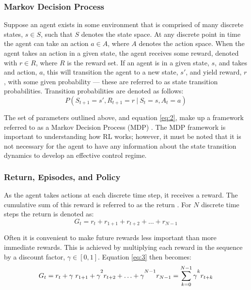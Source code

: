 \subsubsection{Markov Decision Process}\label{mdp1}
Suppose an agent exists in some environment that is comprised of many discrete states, $s \in S$, such that $S$ denotes the state space. At any discrete point in time the agent can take an action $a \in A$, where $A$ denotes the action space. When the agent takes an action in a given state, the agent receives some reward, denoted with $r \in R$, where $R$ is the reward set. If an agent is in a given state, $s$, and takes and action, $a$, this will transition the agent to a new state, $s'$, and yield reward, $r$, with some given probability --- these are referred to as state transition probabilities. Transition probabilities are denoted as follows:
\begin{equation}
P(S_{t+1}=s', R_{t+1}=r \ | \ S_t = s, A_t = a)\label{eq:2}
\end{equation}

The set of parameters outlined above, and equation \ref{eq:2}, make up a framework referred to as a Markov Decision Process (MDP) \cite{Bellm1957}. The MDP framework is important to understanding how RL works; however, it must be noted that it is not necessary for the agent to have any information about the state transition dynamics to develop an effective control regime.

\subsubsection{Return, Episodes, and Policy}\label{mdp2}
As the agent takes actions at each discrete time step, it receives a reward. The cumulative sum of this reward is referred to as the return \cite{openai2018}. For $N$ discrete time steps the return is denoted as:
\begin{equation}
G_t = r_t + r_{1+1} + r_{t+2} + \ldots + r_{N-1}\label{eq:3}
\end{equation}

Often it is convenient to make future rewards less important than more immediate rewards. This is achieved by multiplying each reward in the sequence by a discount factor, $\gamma \in [0,1]$. Equation \ref{eq:3} then becomes:
\begin{equation}
G_t = r_t + \gamma \ r_{1+1} + \gamma\mystrut^2 r_{t+2} + \ldots + \gamma\mystrut^{N-1} r_{N-1} = \sum_{k = 0}^{N-1} \gamma\mystrut^k r_{t+k}
\end{equation}

